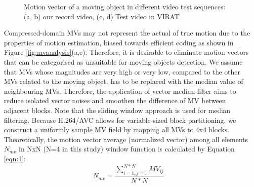 \begin{figure}
{}
\caption{Motion vector of a moving object in different video test sequences: (a, b) our record video, (c, d) Test video in VIRAT}
\label{fig:mvobject}
\end{figure}
Compressed-domain MVs may not represent the actual of true motion due to the properties of motion estimation, biased towards efficient coding as shown in Figure \ref{fig:mvanalysis}(a,e). Therefore, it is desirable to eliminate motion vectors that can be categorised as unsuitable for moving objects detection. We assume that MVs  whose magnitudes are very high or very low, compared to the other MVs related to the moving object, has to be replaced with the median value of neighbouring MVs. Therefore, the application of vector median filter aims to reduce isolated vector noises and smoothen the difference of MV between adjacent blocks. Note that the sliding window approach is used for median filtering. Because H.264/AVC allows for variable-sized block partitioning, we construct a uniformly sample MV field by mapping all MVs to 4x4 blocks. Theoretically, the motion vector average (normalized vector) among all elements $N_{mv}$ in NxN (N=4 in this study) window function is calculated by Equation \ref{eqn:1}: 
\begin{equation}
\label{eqn:1}
N_{mv}= \frac{\sum_{i=1, j=1}^{N*N}MV_{ij}}{N*N}
\end{equation}          
